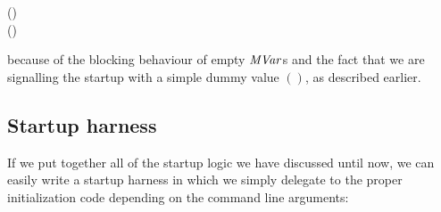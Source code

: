 \documentclass[paper=A4,twoside=true,openright,parskip=full,chapterprefix=true,headings=normal,bibliography=totoc,listof=totoc,titlepage=on,captions=tableabove,draft=false,british]{scrreprt}%
\begin{document}
\begin{hscode}\SaveRestoreHook
{}%
%
\>[B]{}\mathbin{::}\to {}\;(){}\<[E]%
\\
\>[B]{}\;\mathrel{=}\;(\;){}\<[E]%
\ColumnHook
\end{hscode}\resethooks
\vspace{-2\baselineskip}

because of the blocking behaviour of empty \ensuremath{\Conid{MVar}}s and the fact that we
are signalling the startup with a simple dummy value \ensuremath{()}, as described
earlier.

\hypertarget{startup-harness}{%
\subsection{Startup harness}\label{startup-harness}}

\label{sec:cloudhaskellstartupharness}

If we put together all of the startup logic we have discussed until now,
we can easily write a startup harness in which we simply delegate to the
proper initialization code depending on the command line arguments:
\end{document}

